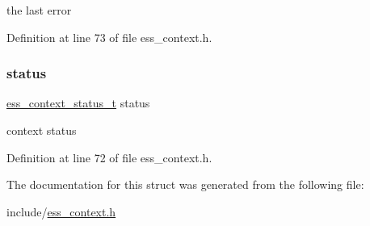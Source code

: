 the last error 

Definition at line 73 of file ess\+\_\+context.\+h.

\mbox{\label{structess__context_a6151ccede5aaf683375710d2677c74c7}} 
\subsubsection{\texorpdfstring{status}{status}}
{\footnotesize\ttfamily \hyperlink{ess__context_8h_adb5314cbbcb2bed6fc8b770d8ef3257c}{ess\+\_\+context\+\_\+status\+\_\+t} status}

context status 

Definition at line 72 of file ess\+\_\+context.\+h.



The documentation for this struct was generated from the following file\+:\begin{DoxyCompactItemize}
\item 
include/\hyperlink{ess__context_8h}{ess\+\_\+context.\+h}\end{DoxyCompactItemize}
